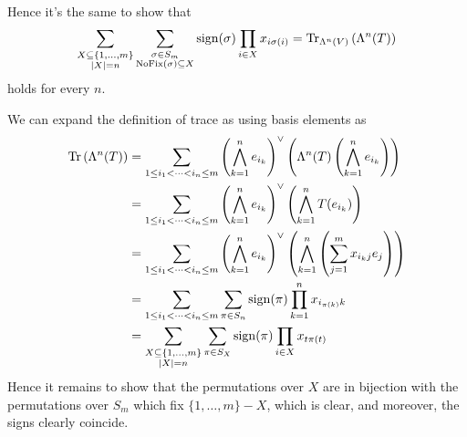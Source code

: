 \begin{problem}
\begin{sol}
		Hence it's the same to show that
		\[
			\sum_{\substack{X \subseteq \{1, \dots, m\} \\ \left\lvert X \right\rvert = n} }
			\sum_{\substack{\sigma \in S_m \\ \operatorname{NoFix}(\sigma) \subseteq X}}
			\operatorname{sign}(\sigma) \prod_{i \in X} x_{i \sigma(i)}
			= \operatorname{Tr}_{\Lambda^n(V)} \left( \Lambda^n(T) \right)
		\]
		holds for every $n$.

		We can expand the definition of trace as using basis elements as
		\begin{align*}
			\operatorname{Tr}\left( \Lambda^n(T) \right)
			&= \sum_{1 \le i_1 < \dots < i_n \le m}
			\left( \bigwedge_{k=1}^n e_{i_k} \right)^\vee
			\left( \Lambda^n(T) \left( \bigwedge_{k=1}^n e_{i_k} \right) \right) \\
			&= \sum_{1 \le i_1 < \dots < i_n \le m}
			\left( \bigwedge_{k=1}^n e_{i_k} \right)^\vee
			\left(  \bigwedge_{k=1}^n T(e_{i_k}) \right) \\
			&= \sum_{1 \le i_1 < \dots < i_n \le m}
			\left( \bigwedge_{k=1}^n e_{i_k} \right)^\vee
			\left(  \bigwedge_{k=1}^n 
			\left( \sum_{j=1}^m x_{i_kj} e_j \right)
			\right) \\
			&= \sum_{1 \le i_1 < \dots < i_n \le m}
			\sum_{\pi \in S_n} \operatorname{sign}(\pi) \prod_{k=1}^n x_{i_{\pi(k)}k} \\
			&= \sum_{\substack{X \subseteq \{1,\dots,m\} \\ \left\lvert X \right\rvert = n}}
			\sum_{\pi \in S_X} \operatorname{sign}(\pi) \prod_{i \in X} x_{t \pi(t)}
		\end{align*}
		Hence it remains to show that the permutations over $X$
		are in bijection with the permutations over $S_m$ which fix $\{1, \dots, m\} - X$,
		which is clear, and moreover, the signs clearly coincide.
	\end{sol}
\end{problem}


